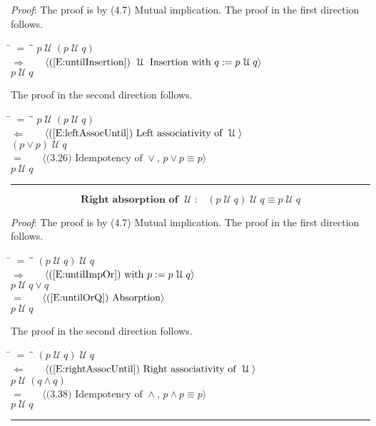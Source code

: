 \documentclass[12pt, fleqn, leqno]{article}
\newcommand{\lgap}{2pt}                             %
\newcommand{\mymathindent}{24pt}                    %
\newcommand{\impl}{\ensuremath{\Rightarrow}}        %
\newcommand{\foll}{\ensuremath{\Leftarrow}}         %
\newcommand{\Until}{\;\mathcal{U}\;}
\newcommand{\myqed}{\rule[-.23ex]{1.2ex}{2.0ex}}
\newcommand{\myqedtab}{\hspace{384pt}}              %
\newcommand{\Gll} {\langle}                         %
\newcommand{\Ggg} {\rangle}                         %
\newcommand{\Hint}[1]     {\ \ \ $\Gll              \mbox{#1} \Ggg$ }   %
\begin{document}
\emph{Proof}: The proof is by (4.7) Mutual implication.
The proof in the first direction follows.
\begin{tabbing}
\hspace{\mymathindent} \= $= \;$ \= \myqedtab \= \kill
\> \> $p \Until (p \Until q)$\\[\lgap]
\> $\impl$ \> \Hint{(\ref{E:untilInsertion}) $\Until$ Insertion with $q:=p\Until q$} \\[\lgap]
\> \> $p \Until q$\\
\end{tabbing}
The proof in the second direction follows.
\begin{tabbing}
\hspace{\mymathindent} \= $= \;$ \= \myqedtab \= \kill
\> \> $p \Until (p \Until q)$\\[\lgap]
\> $\foll$ \> \Hint{(\ref{E:leftAssocUntil}) Left associativity of $\Until$} \\[\lgap]
\> \> $(p\lor p) \Until q$\\[\lgap]
\> $=$ \> \Hint{(3.26) Idempotency of $\lor$, $p \lor p \equiv p$} \\[\lgap]
\> \> $p \Until q$ \quad \myqed
\end{tabbing}
\begin{equation}\label{E:untilIdemR}
\textbf{Right absorption of $\Until$:}\quad (p \Until q) \Until q \equiv p \Until q
\end{equation}

\emph{Proof}: The proof is by (4.7) Mutual implication.
The proof in the first direction follows.
\begin{tabbing}
\hspace{\mymathindent} \= $= \;$ \= \myqedtab \= \kill
\> \> $(p \Until q) \Until q$\\[\lgap]
\> $\impl$ \> \Hint{(\ref{E:untilImpOr}) with $p:=p\Until q$} \\[\lgap]
\> \> $p \Until q \lor q$\\[\lgap]
\> $=$ \> \Hint{(\ref{E:untilOrQ}) Absorption} \\[\lgap]
\> \> $p\Until q$
\end{tabbing}
The proof in the second direction follows.
\begin{tabbing}
\hspace{\mymathindent} \= $= \;$ \= \myqedtab \= \kill
\> \> $(p \Until q) \Until q$\\[\lgap]
\> $\foll$ \> \Hint{(\ref{E:rightAssocUntil}) Right associativity of $\Until$} \\[\lgap]
\> \> $p \Until (q \land q)$\\[\lgap]
\> $=$  \>  \Hint{(3.38) Idempotency of $\land$, $p\land p \equiv p$}\\[\lgap]
\> \> $p \Until q$ \quad \myqed
\end{tabbing}
\end{document}
